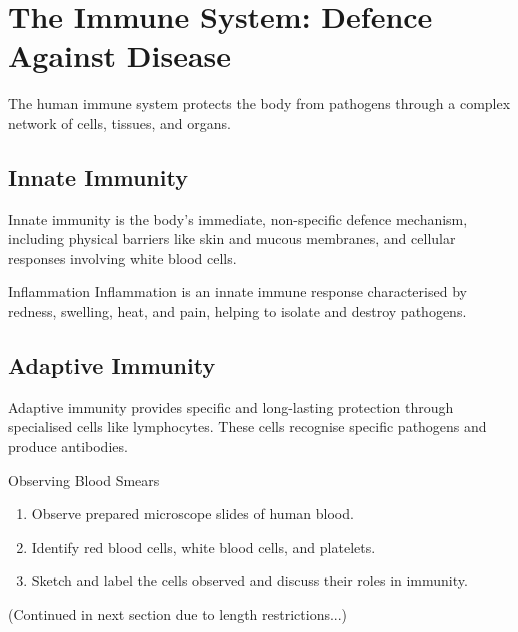 \section{The Immune System: Defence Against Disease}

The human immune system protects the body from pathogens through a complex network of cells, tissues, and organs.

\subsection{Innate Immunity}

Innate immunity is the body's immediate, non-specific defence mechanism, including physical barriers like skin and mucous membranes, and cellular responses involving white blood cells.

\begin{keyconcept}{Inflammation}
Inflammation is an innate immune response characterised by redness, swelling, heat, and pain, helping to isolate and destroy pathogens.
\end{keyconcept}

\subsection{Adaptive Immunity}

Adaptive immunity provides specific and long-lasting protection through specialised cells like lymphocytes. These cells recognise specific pathogens and produce antibodies.


\begin{investigation}{Observing Blood Smears}
\begin{enumerate}
    \item Observe prepared microscope slides of human blood.
    \item Identify red blood cells, white blood cells, and platelets.
    \item Sketch and label the cells observed and discuss their roles in immunity.
\end{enumerate}
\end{investigation}

(Continued in next section due to length restrictions...)